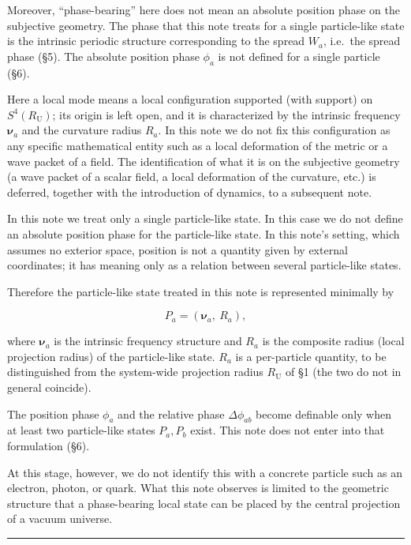 \documentclass[
]{article}
\begin{document}
Moreover, ``phase-bearing'' here does not mean an absolute position
phase on the subjective geometry. The phase that this note treats for a
single particle-like state is the intrinsic periodic structure
corresponding to the spread \(W_a\), i.e.~the spread phase (§5). The
absolute position phase \(\phi_a\) is not defined for a single particle
(§6).

Here a local mode means a local configuration supported (with support)
on \(S^4(R_{\mathrm U})\); its origin is left open, and it is
characterized by the intrinsic frequency \(\boldsymbol{\nu}_a\) and the
curvature radius \(R_a\). In this note we do not fix this configuration
as any specific mathematical entity such as a local deformation of the
metric or a wave packet of a field. The identification of what it is on
the subjective geometry (a wave packet of a scalar field, a local
deformation of the curvature, etc.) is deferred, together with the
introduction of dynamics, to a subsequent note.

In this note we treat only a single particle-like state. In this case we
do not define an absolute position phase for the particle-like state. In
this note's setting, which assumes no exterior space, position is not a
quantity given by external coordinates; it has meaning only as a
relation between several particle-like states.

Therefore the particle-like state treated in this note is represented
minimally by

\[P_a=(\boldsymbol{\nu}_a,\ R_a),\]

where \(\boldsymbol{\nu}_a\) is the intrinsic frequency structure and
\(R_a\) is the composite radius (local projection radius) of the
particle-like state. \(R_a\) is a per-particle quantity, to be
distinguished from the system-wide projection radius \(R_{\mathrm U}\)
of §1 (the two do not in general coincide).

The position phase \(\phi_a\) and the relative phase \(\Delta\phi_{ab}\)
become definable only when at least two particle-like states \(P_a,P_b\)
exist. This note does not enter into that formulation (§6).

At this stage, however, we do not identify this with a concrete particle
such as an electron, photon, or quark. What this note observes is
limited to the geometric structure that a phase-bearing local state can
be placed by the central projection of a vacuum universe.

\begin{center}\rule{0.5\linewidth}{0.5pt}\end{center}
\end{document}

